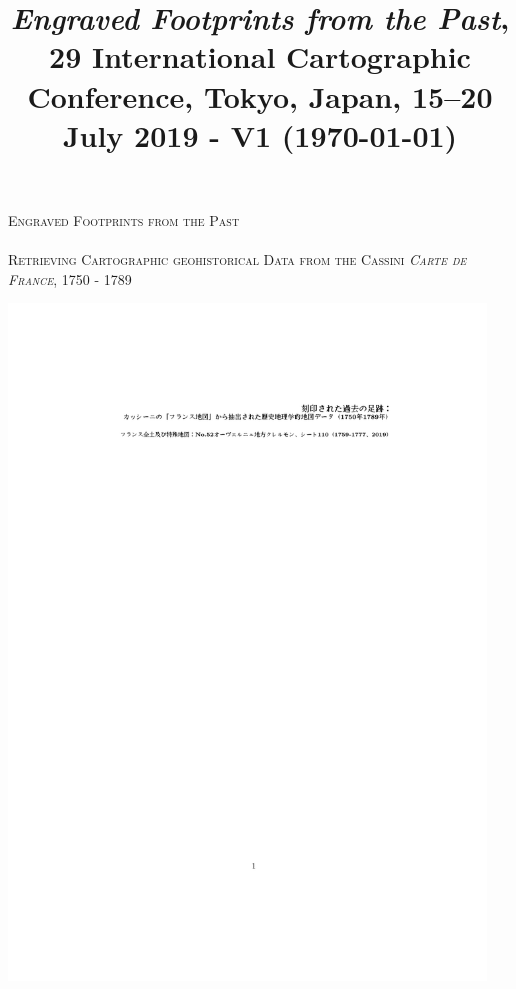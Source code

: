 \documentclass[portrait,a0]{sciposter}
\title{\normalfont \emph{Engraved Footprints from the Past}, 29\up{th} International Cartographic Conference, Tokyo, Japan, 15–20 July 2019 - V1 (\today)}
\institute{EHESS}
\begin{document}
\makeatletter
\conference{\bf \@title}
\makeatother
\bgroup
\setlength{\parindent}{-0.1em} 
\begin{minipage}[t]{0.56\textwidth}
  \Huge
  \textsc{Engraved Footprints from the Past}\\~\\
  \Large \textsc{Retrieving Cartographic geohistorical Data from the Cassini \textit{Carte de France}, 1750 - 1789}
\end{minipage}
\begin{minipage}[t]{0.43\textwidth}
  \vspace*{-3.2cm}
  \hfill
  \includegraphics[width=0.95\textwidth, trim= 5cm 26cm 4cm 22cm, clip]{gfx/jap.pdf}
\end{minipage}
\egroup
\end{document}
